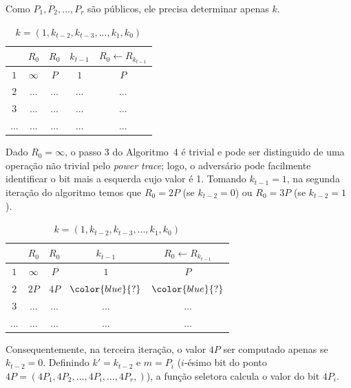 \documentclass{SBCbookchapter}
\begin{document}
Como $P_{1} , P_{2} , ..., P_{r}$ s\~{a}o p\'{u}blicos, ele precisa determinar apenas $k$.
\begin{table}[htb]
\begin{center}
    \begin{tabular}{|c|c|c|c|c|}
	    \hline
		    \   & $R_{0}$  & $R_{0}$ & $k_{t-1}$ & $R_{0} \leftarrow R_{k_{t-1}}$\\
	    \hline
	        $1$ & $\infty$ &     $P$ &       $1$ & $P$\\
	    \hline
		    $2$ & ... & ... & ... & ...\\
	    \hline
		    $3$ & ... & ... & ...& ... \\
	    \hline
		    ... & ... & ... & ...& ... \\
	    \hline
    \end{tabular}
\caption{ $k = (1, k_{t-2}, k_{t-3}, ..., k_{1}, k_{0})$}
\end{center}
\end{table}
Dado $R_{0} = \infty$, o passo 3 do Algoritmo~4 \'{e} trivial e pode ser disting{u}ido de uma opera\c{c}\~{a}o n\~{a}o trivial pelo \emph{power trace}; logo, o advers\'{a}rio pode facilmente identificar o bit mais a esquerda cujo valor é 1. Tomando $k_{t-1}= 1$, na segunda itera\c{c}\~{a}o do algoritmo temos que $R_{0} = 2P$ (se $k_{t-2} = 0$) ou $R_{0} = 3P$ (se $k_{t-2} = 1$).
\begin{table}[htb]
\begin{center}
    \begin{tabular}{|c|c|c|c|c|}
	    \hline
		    \   & $R_{0}$  & $R_{0}$ & $k_{t-1}$ & $R_{0} \leftarrow R_{k_{t-1}}$\\
	    \hline
	        $1$ & $\infty$ &     $P$ &       $1$ & $P$\\
	    \hline
		    $2$ & $2P$ & $4P$ & $\color{blue}{?}$ & $\color{blue}{?}$ \\
	    \hline
		    $3$ & ... & ... & ...& ... \\
	    \hline
		    ... & ... & ... & ...& ... \\
	    \hline
    \end{tabular}
\caption{$k = (1, k_{t-2}, k_{t-3}, ..., k_{1}, k_{0})$}
\end{center}
\end{table}
Conseq{u}entemente, na terceira itera\c{c}\~{a}o, o valor $4P$ ser computado apenas se $k_{t-2} = 0$. Definindo $k' = k_{t-2}$ e $m = P_{i}$ ($i$-\'{e}simo bit do ponto $4P = (4P_{1} , 4P_{2} , ..., 4P_{i} , ..., 4P_{r} , )$), a fun\c{c}\~{a}o seletora calcula o valor do bit $4P_{i}$.
\end{document}
